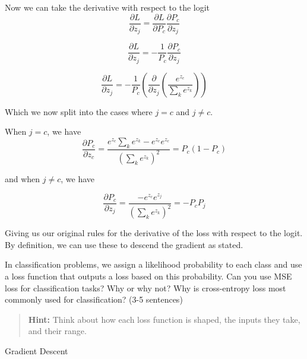 \documentclass[11pt, answers]{exam}
\begin{document}
\begin{questions}
\begin{solution}
		Now we can take the derivative with respect to the logit
		\[ \frac{\partial L}{\partial z_j} = \frac{\partial L}{\partial P_c} \frac{\partial P_c}{\partial z_j} \]

		\[ \frac{\partial L}{\partial z_j} = -\frac{1}{P_c} \frac{\partial P_c}{\partial z_j} \]

		\[ \frac{\partial L}{\partial z_j} = -\frac{1}{P_c} \left( \frac{\partial}{\partial z_j} \left( \frac{e^{z_c}}{\sum_{k} e^{z_k}} \right) \right) \]

		Which we now split into the cases where \( j = c \) and \( j \neq c \).

		When \( j = c \), we have
		\[
			\frac{\partial P_c}{\partial z_c} = \frac{e^{z_c} \sum_{k} e^{z_k} - e^{z_c} e^{z_c}}{\left( \sum_{k} e^{z_k} \right)^2} = P_c(1 - P_c)
		\]

		and when \( j \neq c \), we have

		\[
			\frac{\partial P_c}{\partial z_j} = \frac{-e^{z_c} e^{z_j}}{\left( \sum_{k} e^{z_k} \right)^2} = -P_c P_j
		\]

		Giving us our original rules for the derivative of the loss with respect to the logit. By definition, we can use these to descend the gradient as stated.

	\end{solution}

	\question In classification problems, we assign a likelihood probability to each class and use a loss function that outputs a loss based on this probability. Can you use MSE loss for classification tasks? Why or why not? Why is cross-entropy loss most commonly used for classification? (3-5 sentences)

	\begin{quote}
		\textbf{Hint:} Think about how each loss function is shaped, the inputs they take, and their range.
	\end{quote}

	\newpage

	\question Gradient Descent

\end{questions}
\end{document}
